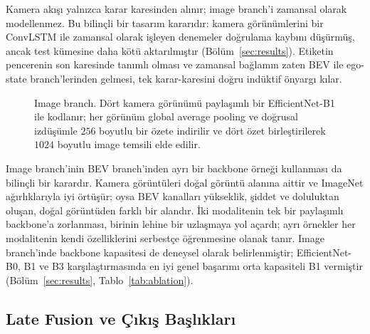 \documentclass[conference]{IEEEtran}
\begin{document}
Kamera akışı yalnızca karar karesinden alınır; image branch'i zamansal olarak modellenmez. Bu bilinçli bir tasarım kararıdır: kamera görünümlerini bir ConvLSTM ile zamansal olarak işleyen denemeler doğrulama kaybını düşürmüş, ancak test kümesine daha kötü aktarılmıştır (Bölüm~\ref{sec:results}). Etiketin pencerenin son karesinde tanımlı olması ve zamansal bağlamın zaten BEV ile ego-state branch'lerinden gelmesi, tek karar-karesini doğru indüktif önyargı kılar.

\begin{figure}[t]
\centering
{}
\caption{Image branch. Dört kamera görünümü paylaşımlı bir EfficientNet-B1 ile kodlanır; her görünüm global average pooling ve doğrusal izdüşümle $256$ boyutlu bir özete indirilir ve dört özet birleştirilerek $1024$ boyutlu image temsili elde edilir.}
\label{fig:image}
\end{figure}

Image branch'inin BEV branch'inden ayrı bir backbone örneği kullanması da bilinçli bir karardır. Kamera görüntüleri doğal görüntü alanına aittir ve ImageNet ağırlıklarıyla iyi örtüşür; oysa BEV kanalları yükseklik, şiddet ve doluluktan oluşan, doğal görüntüden farklı bir alandır. İki modalitenin tek bir paylaşımlı backbone'a zorlanması, birinin lehine bir uzlaşmaya yol açardı; ayrı örnekler her modalitenin kendi özelliklerini serbestçe öğrenmesine olanak tanır. Image branch'inde backbone kapasitesi de deneysel olarak belirlenmiştir; EfficientNet-B0, B1 ve B3 karşılaştırmasında en iyi genel başarımı orta kapasiteli B1 vermiştir (Bölüm~\ref{sec:results}, Tablo~\ref{tab:ablation}).

\subsection{Late Fusion ve Çıkış Başlıkları}
\end{document}

